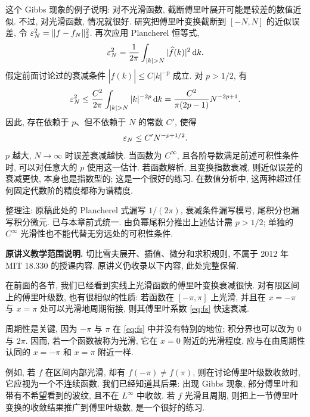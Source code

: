 这个 Gibbs 现象的例子说明: 对不光滑函数, 截断傅里叶展开可能是较差的数值近似. 不过, 对光滑函数, 情况就很好. 研究把傅里叶变换截断到 $[-N,N]$ 的近似误差, 令 $\varepsilon_N^2=\lVert f-f_N\rVert_2^2$. 再次应用 Plancherel 恒等式,
\[
\eps_N^2=\frac1{2\pi}\int_{|k|>N}|\widehat f(k)|^2\dd k.
\]
假定前面讨论过的衰减条件 $|\widehat f(k)|\le C|k|^{-p}$ 成立. 对 $p>1/2$, 有
\[
\eps_N^2\le\frac{C^2}{2\pi}\int_{|k|>N}|k|^{-2p}\dd k
=\frac{C^2}{\pi(2p-1)}N^{-2p+1}.
\]
因此, 存在依赖于 $p$、但不依赖于 $N$ 的常数 $C'$, 使得
\[
\varepsilon_N\le C'N^{-p+1/2}.
\]
$p$ 越大, $N\to\infty$ 时误差衰减越快. 当函数为 $C^\infty$, 且各阶导数满足前述可积性条件时, 可以对任意大的 $p$ 使用这一估计. 若函数解析, 且变换指数衰减, 则近似误差的衰减更快, 本身也是指数型的; 这是一个很好的练习. 在数值分析中, 这两种超过任何固定代数阶的精度都称为谱精度.
\begin{remark}
整理注: 原稿此处的 Plancherel 式漏写 $1/(2\pi)$, 衰减条件漏写模号, 尾积分也漏写积分微元. 已与本章前式统一. 由负幂尾积分推出上述估计需 $p>1/2$; 单独的 $C^\infty$ 光滑性也不能代替无穷远处的可积性条件.
\end{remark}

\label{sec:chebyshev-expansion}
\textbf{原讲义教学范围说明.} 切比雪夫展开、插值、微分和求积规则, 不属于 2012 年 MIT 18.330 的授课内容. 原讲义仍收录以下内容, 此处完整保留.

在前面的各节, 我们已经看到实线上光滑函数的傅里叶变换衰减很快. 对有限区间上的傅里叶级数, 也有很相似的性质: 若函数在 $[-\pi,\pi]$ 上光滑, 并且在 $x=-\pi$ 与 $x=\pi$ 处可以光滑地周期衔接, 则其傅里叶系数 \eqref{eq:fs} 快速衰减.

周期性是关键, 因为 $-\pi$ 与 $\pi$ 在 \eqref{eq:fs} 中并没有特别的地位; 积分界也可以改为 $0$ 与 $2\pi$. 因而, 若一个函数被称为光滑, 它在 $x=0$ 附近的光滑程度, 应与在由周期性认同的 $x=-\pi$ 和 $x=\pi$ 附近一样.

例如, 若 $f$ 在区间内部光滑, 却有 $f(-\pi)\ne f(\pi)$, 则在讨论傅里叶级数收敛时, 它应视为一个不连续函数. 我们已经知道其后果: 出现 Gibbs 现象, 部分傅里叶和带有不希望看到的波纹, 且不在 $L^\infty$ 中收敛. 若 $f$ 光滑且周期, 则把上一节傅里叶变换的收敛结果推广到傅里叶级数, 是一个很好的练习.

